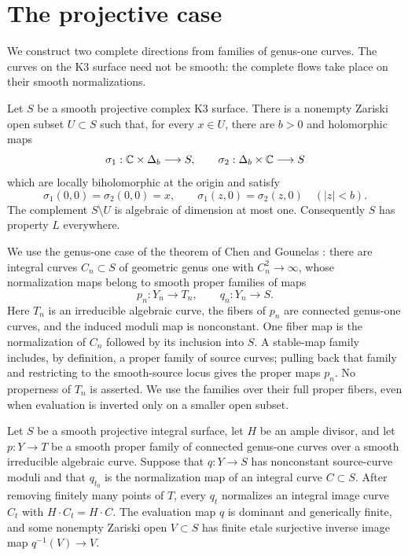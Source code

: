 \section{The projective case}\label{sec:projective}

We construct two complete directions from families of genus-one
curves. The curves on the K3 surface need not be smooth: the
complete flows take place on their smooth normalizations.

\begin{proposition}\label{prj:strips}
Let $S$ be a smooth projective complex K3 surface. There is a
nonempty Zariski open subset $U\subset S$ such that, for every
$x\in U$, there are $b>0$ and holomorphic maps
\[
\sigma_1:\mathbb C\times\Delta_b\longrightarrow S,\qquad
\sigma_2:\Delta_b\times\mathbb C\longrightarrow S
\]
which are locally biholomorphic at the origin and satisfy
\[
\sigma_1(0,0)=\sigma_2(0,0)=x,\qquad
\sigma_1(z,0)=\sigma_2(z,0)\quad (|z|<b).
\]
The complement $S\setminus U$ is algebraic of dimension at most
one. Consequently $S$ has property $L$ everywhere.
\end{proposition}

We use the genus-one case of the theorem of Chen and Gounelas
\cite[Theorem~A]{ChenGounelas}:
there are integral curves $C_n\subset S$ of geometric genus one
with $C_n^2\to\infty$, whose normalization maps belong to smooth
proper families of maps
\[
p_n:Y_n\longrightarrow T_n,\qquad q_n:Y_n\longrightarrow S.
\]
Here $T_n$ is an irreducible algebraic curve, the fibers of $p_n$
are connected genus-one curves, and the induced moduli map is
nonconstant. One fiber map is the normalization of $C_n$ followed
by its inclusion into $S$. A stable-map family includes, by definition,
a proper family of source curves; pulling back that family and restricting
to the smooth-source locus gives the proper maps $p_n$. No properness of
$T_n$ is asserted. We use the families over their full proper
fibers, even when evaluation is inverted only on a smaller open
subset.

\begin{lemma}\label{prj:prepare}
Let $S$ be a smooth projective integral surface, let $H$ be an
ample divisor, and let $p:Y\to T$ be a smooth proper family of
connected genus-one curves over a smooth irreducible algebraic
curve. Suppose that $q:Y\to S$ has nonconstant source-curve
moduli and that $q_{t_0}$ is the normalization map of an integral
curve $C\subset S$. After removing finitely many points of $T$,
every $q_t$ normalizes an integral image curve $C_t$ with
$H\cdot C_t=H\cdot C$. The evaluation map $q$ is dominant and
generically finite, and some nonempty Zariski open $V\subset S$
has finite etale surjective inverse image map $q^{-1}(V)\to V$.
\end{lemma}

